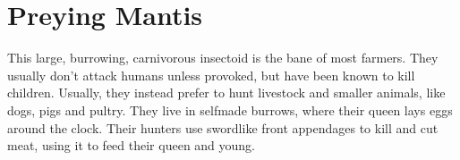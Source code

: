 \section{Preying Mantis}

This large, burrowing, carnivorous insectoid is the bane of most farmers. They usually don't attack humans unless provoked, but have been known to kill children. Usually, they instead prefer to hunt livestock and smaller animals, like dogs, pigs and pultry. They live in selfmade burrows, where their queen lays eggs around the clock. Their hunters use swordlike front appendages to kill and cut meat, using it to feed their queen and young.